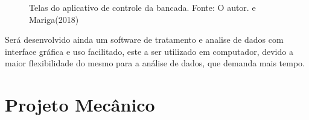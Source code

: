 \begin{figure}[!ht]
    \centering
    \caption{Telas do aplicativo de controle da bancada. Fonte: O autor. e Mariga(2018)}
        \label{tela_app3}
        \qquad
        \label{tela_app4}
\end{figure}

Será desenvolvido ainda um software de tratamento e analise de dados com interface gráfica e uso facilitado, este a ser utilizado em computador, devido a maior flexibilidade do mesmo para a análise de dados, que demanda mais tempo.

\section{Projeto Mecânico}

